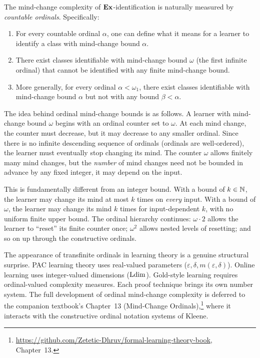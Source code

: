 \begin{thm}
\label{thm:mind-change-ordinal}
  \leanok
The mind-change complexity of $\mathbf{Ex}$-identification is naturally measured by \emph{countable ordinals}. Specifically:
\begin{enumerate}[label=(\roman*),leftmargin=*]
\item For every countable ordinal $\alpha$, one can define what it means for a learner to identify a class with mind-change bound $\alpha$.
\item There exist classes identifiable with mind-change bound $\omega$ (the first infinite ordinal) that cannot be identified with any finite mind-change bound.
\item More generally, for every ordinal $\alpha < \omega_1$, there exist classes identifiable with mind-change bound $\alpha$ but not with any bound $\beta < \alpha$.
\end{enumerate}
\end{thm}

The idea behind ordinal mind-change bounds is as follows. A learner with mind-change bound $\omega$ begins with an ordinal counter set to $\omega$. At each mind change, the counter must decrease, but it may decrease to any smaller ordinal. Since there is no infinite descending sequence of ordinals (ordinals are well-ordered), the learner must eventually stop changing its mind. The counter $\omega$ allows finitely many mind changes, but the \emph{number} of mind changes need not be bounded in advance by any fixed integer, it may depend on the input.

This is fundamentally different from an integer bound. With a bound of $k \in \mathbb{N}$, the learner may change its mind at most $k$ times on \emph{every} input. With a bound of $\omega$, the learner may change its mind $k$ times for input-dependent $k$, with no uniform finite upper bound. The ordinal hierarchy continues: $\omega \cdot 2$ allows the learner to ``reset'' its finite counter once; $\omega^2$ allows nested levels of resetting; and so on up through the constructive ordinals.

\begin{remark}
\label{rmk:ordinals-surprise}
The appearance of transfinite ordinals in learning theory is a genuine structural surprise. PAC learning theory uses real-valued parameters ($\varepsilon, \delta, m(\varepsilon, \delta)$). Online learning uses integer-valued dimensions ($\mathrm{Ldim}$). Gold-style learning requires ordinal-valued complexity measures. Each proof technique brings its own number system. The full development of ordinal mind-change complexity is deferred to the companion textbook's Chapter~13 (Mind-Change Ordinals),\footnote{\url{https://github.com/Zetetic-Dhruv/formal-learning-theory-book}, Chapter~13.} where it interacts with the constructive ordinal notation systems of Kleene.
\end{remark}

